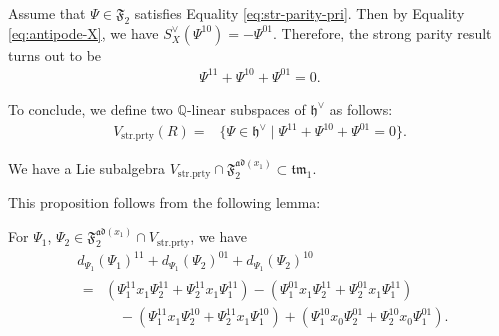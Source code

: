 \documentclass[15pt,oneside,reqno]{amsart}
\theoremstyle{remark}{
\newtheorem{lem}[df]{Lemma}
\newtheorem{prop}[df]{Proposition}
\newtheorem{ex}[df]{Example}
\newtheorem{rmk}[df]{Remark}
}
\newcommand{\ide}[1]{\mathfrak{#1}}
\newcommand{\Q}{\mathbb{Q}}
\newcommand{\ad}{\mathfrak{ad}}
\newcommand{\tm}{\mathfrak{tm}}
\newcommand{\Fad}{\mathfrak{F}_2^{\ad(x_1)}}
\newcommand{\strprty}{\mathrm{str.prty}}
\begin{document}
Assume that $\Psi \in \ide{F}_2$ satisfies Equality \eqref{eq:str-parity-pri}.
Then by Equality \eqref{eq:antipode-X}, we have $S_{X}^{\vee}(\Psi^{10}) = -\Psi^{01}$.
Therefore, the strong parity result turns out to be
\begin{align}
\Psi^{11} + \Psi^{10} + \Psi^{01} = 0. \label{eq:str-prty-3cycle}
\end{align}
 
To conclude, we define two $\Q$-linear subspaces of $\ide{h}^{\vee}$ as follows:
\begin{align*}
V_{\strprty}(R) =& \{\Psi \in  \ide{h}^{\vee} \mid \Psi^{11} + \Psi^{10} + \Psi^{01} = 0\}.
\end{align*}

\begin{prop}\label{prop:deriv-strprty}
We have a Lie subalgebra $V_{\strprty} \cap \Fad \subset \tm_1$.
\end{prop}

This proposition follows from the following lemma:

\begin{lem}
For $\Psi_1$, $\Psi_2 \in  \Fad \cap V_{\strprty}$, we have
\begin{align*}
&d_{\Psi_1}(\Psi_1)^{11} + d_{\Psi_1}(\Psi_2)^{01} + d_{\Psi_1}(\Psi_2)^{10}\\
&\begin{aligned}
=&(\Psi_{1}^{11}x_1\Psi_2^{11} + \Psi_{2}^{11}x_1\Psi_1^{11}) - ( \Psi_1^{01}x_1\Psi_2^{11} + \Psi_2^{01}x_1\Psi_1^{11}) \\
&\quad-(\Psi_1^{11}x_1\Psi_2^{10} + \Psi_2^{11}x_1\Psi_1^{10}) + (\Psi_{1}^{10}x_0\Psi_2^{01}  +  \Psi_{2}^{10}x_0\Psi_1^{01} ).
\end{aligned}
\end{align*}
\end{lem}
\end{document}
